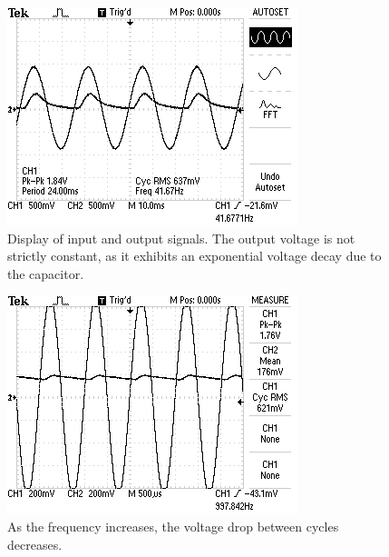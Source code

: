\documentclass[twocolumn,english]{IEEEtran}
\begin{document}
\begin{figure}[H]
  \begin{centering}
  \begin{center}
  \includegraphics[width=\linewidth]{./DC1.png}
  \caption{Display of input and output signals. The output voltage is not strictly constant, as it exhibits an exponential voltage decay due to the capacitor.}
  \label{fig:DC1}
  \end{center}
  \par\end{centering}
\end{figure}

\begin{figure}[H]
  \begin{centering}
  \begin{center}
  \includegraphics[width=\linewidth]{./DC2.png}
  \caption{As the frequency increases, the voltage drop between cycles decreases.}
  \label{fig:DC2}
  \end{center}
  \par\end{centering}
\end{figure}
\end{document}
